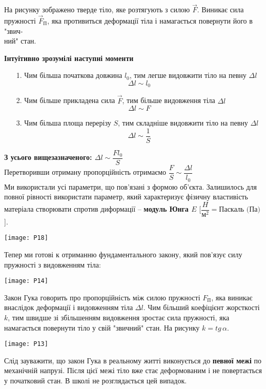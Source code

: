 \documentclass[a4paper,12pt]{article}
\begin{document}

На рисунку зображено тверде тіло, яке розтягують з силою $\vec{F}$. Виникає сила пружності $\vec{F}_{\text{П}}$, яка противиться деформації тіла і намагається повернути його в "звич-\\ний" \thinspace стан. \\

\begin{center}
\textcolor{EdErablue}{\textbf{Інтуітивно зрозумілі наступні моменти}}
\end{center}

\begin{itemize} \item[1.] Чим більша початкова довжина $l_0$, тим легше видовжити тіло на певну $\Delta l$ $$\Delta l \sim l_0$$  \item[2.]Чим більше прикладена сила $\vec{F}$, тим більше видовження тіла $\Delta l$ $$\Delta l \sim F$$ \item[3.]Чим більша площа  перерізу $S$, тим складніше видовжити тіло на певну $\Delta l$ $$\Delta l \sim \dfrac{1}{S}$$\end{itemize}

\textcolor{EdErablue}{\textbf{З усього вищезазначеного: $\boxed{\Delta l \sim \dfrac{Fl_0}{S}}$}}\\

Перетворивши отриману пропорційність отримаємо $\dfrac{F}{S} \sim \dfrac{\Delta l}{l_0}$\\

Ми використали усі параметри, що пов'язані з формою об'єкта. Залишилось для повної рівності використати параметр, який характеризує фізичну властивість матеріала створювати спротив диформації – \textcolor{EdErablue}{\textbf{модуль Юнга $E$ }}[$\dfrac{H}{\text{м}^2} = \text{Паскаль (Па)}$].\\ 
\begin{center}
\texttt{[image: P18]}
\end{center}

Тепер ми готові к отриманню фундаментального закону, який пов'язує силу \newline пружності з видовженням тіла:
\begin{center}\texttt{[image: P14]} \end{center}
Закон Гука говорить про пропорційність між силою пружності $F_{\text{П}}$, яка виникає внаслідок деформації і видовженням тіла $\Delta l$. Чим більший коефіцієнт жорсткості $k$, тим швидше зі збільшенням видовження зростає сила пружності, яка намагається повернути тіло у свій "звичний" \thinspace стан. На рисунку $k = tg\,\alpha$.
\begin{center}
\texttt{[image: P13]}
\end{center}
Слід зауважити, що закон Гука в реальному житті виконується до \textbf{певної межі} по механічній напрузі. Після цієї межі тіло вже стає деформованим і не повертається у початковий стан. В школі не розглядається цей випадок. 
\end{document}
